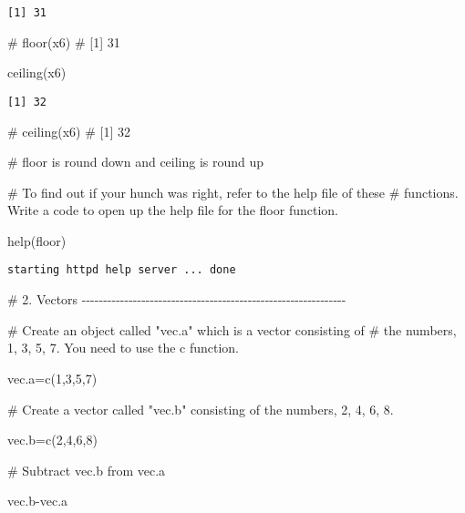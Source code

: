 \documentclass[
  letterpaper,
  DIV=11,
  numbers=noendperiod]{scrartcl}
\newenvironment{Shaded}{\begin{snugshade}}{\end{snugshade}}
\newcommand{\CommentTok}[1]{\textcolor[rgb]{0.37,0.37,0.37}{#1}}
\newcommand{\DecValTok}[1]{\textcolor[rgb]{0.68,0.00,0.00}{#1}}
\newcommand{\FunctionTok}[1]{\textcolor[rgb]{0.28,0.35,0.67}{#1}}
\newcommand{\NormalTok}[1]{\textcolor[rgb]{0.00,0.23,0.31}{#1}}
\newcommand{\OtherTok}[1]{\textcolor[rgb]{0.00,0.23,0.31}{#1}}
\newcommand{\SpecialCharTok}[1]{\textcolor[rgb]{0.37,0.37,0.37}{#1}}
\begin{document}
\begin{verbatim}
[1] 31
\end{verbatim}

\begin{Shaded}
\begin{Highlighting}[]
\CommentTok{\# floor(x6)}
\CommentTok{\# [1] 31}

\FunctionTok{ceiling}\NormalTok{(x6)}
\end{Highlighting}
\end{Shaded}

\begin{verbatim}
[1] 32
\end{verbatim}

\begin{Shaded}
\begin{Highlighting}[]
\CommentTok{\# ceiling(x6)}
\CommentTok{\# [1] 32}

\CommentTok{\# floor is round down and ceiling is round up}


\CommentTok{\# To find out if your hunch was right, refer to the help file of these}
\CommentTok{\# functions. Write a code to open up the help file for the floor function.}


\FunctionTok{help}\NormalTok{(floor)}
\end{Highlighting}
\end{Shaded}

\begin{verbatim}
starting httpd help server ... done
\end{verbatim}

\begin{Shaded}
\begin{Highlighting}[]
\CommentTok{\# 2. Vectors {-}{-}{-}{-}{-}{-}{-}{-}{-}{-}{-}{-}{-}{-}{-}{-}{-}{-}{-}{-}{-}{-}{-}{-}{-}{-}{-}{-}{-}{-}{-}{-}{-}{-}{-}{-}{-}{-}{-}{-}{-}{-}{-}{-}{-}{-}{-}{-}{-}{-}{-}{-}{-}{-}{-}{-}{-}{-}{-}{-}{-}{-}}


\CommentTok{\# Create an object called "vec.a" which is a vector consisting of }
\CommentTok{\# the numbers, 1, 3, 5, 7. You need to use the c function. }


\NormalTok{vec.a}\OtherTok{=}\FunctionTok{c}\NormalTok{(}\DecValTok{1}\NormalTok{,}\DecValTok{3}\NormalTok{,}\DecValTok{5}\NormalTok{,}\DecValTok{7}\NormalTok{)}


\CommentTok{\# Create a vector called "vec.b" consisting of the numbers, 2, 4, 6, 8.}


\NormalTok{vec.b}\OtherTok{=}\FunctionTok{c}\NormalTok{(}\DecValTok{2}\NormalTok{,}\DecValTok{4}\NormalTok{,}\DecValTok{6}\NormalTok{,}\DecValTok{8}\NormalTok{)}


\CommentTok{\# Subtract vec.b from vec.a}


\NormalTok{vec.b}\SpecialCharTok{{-}}\NormalTok{vec.a}
\end{Highlighting}
\end{Shaded}
\end{document}
